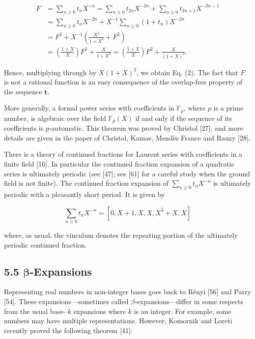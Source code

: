 \documentclass[10pt]{article}
\begin{document}
\[
\begin{aligned}
F & =\sum_{n \geq 0} t_{n} X^{-n}=\sum_{n \geq 0} t_{2 n} X^{-2 n}+\sum_{n \geq 0} t_{2 n+1} X^{-2 n-1} \\
& =\sum_{n \geq 0} t_{n} X^{-2 n}+X^{-1} \sum_{n \geq 0}\left(1+t_{n}\right) X^{-2 n} \\
& =F^{2}+X^{-1}\left(\frac{X^{2}}{1+X^{2}}+F^{2}\right) \\
& =\left(\frac{1+X}{X}\right) F^{2}+\frac{X}{1+X^{2}}=\left(\frac{1+X}{X}\right) F^{2}+\frac{X}{(1+X)^{2}}.
\end{aligned}
\]

Hence, multiplying through by $X(1+X)^{2}$, we obtain Eq. (2). The fact that $F$ is not a rational function is an easy consequence of the overlap-free property of the sequence $\mathbf{t}$.

More generally, a formal power series with coefficients in $\mathbb{F}_{p}$, where $p$ is a prime number, is algebraic over the field $\mathbb{F}_{p}(X)$ if and only if the sequence of its coefficients is $p$-automatic. This theorem was proved by Christol [27], and more details are given in the paper of Christol, Kamae, Mendès France and Rauzy [28].

There is a theory of continued fractions for Laurent series with coefficients in a finite field [16]. In particular the continued fraction expansion of a quadratic series is ultimately periodic (see [47]; see [61] for a careful study when the ground field is not finite). The continued fraction expansion of $\sum_{n \geq 0} t_{n} X^{-n}$ is ultimately periodic with a pleasantly short period. It is given by

\[
\sum_{n \geq 0} t_{n} X^{-n}=\left[0, X+1, \overline{X, X, X^{3}+X, X}\right]
\]

where, as usual, the vinculum denotes the repeating portion of the ultimately periodic continued fraction.

\subsection*{5.5 $\boldsymbol{\beta}$-Expansions}
Representing real numbers in non-integer bases goes back to Rényi [56] and Parry [54]. These expansions---sometimes called $\beta$-expansions---differ in some respects from the usual base- $k$ expansions where $k$ is an integer. For example, some numbers may have multiple representations. However, Komornik and Loreti recently proved the following theorem [41]:
\end{document}
